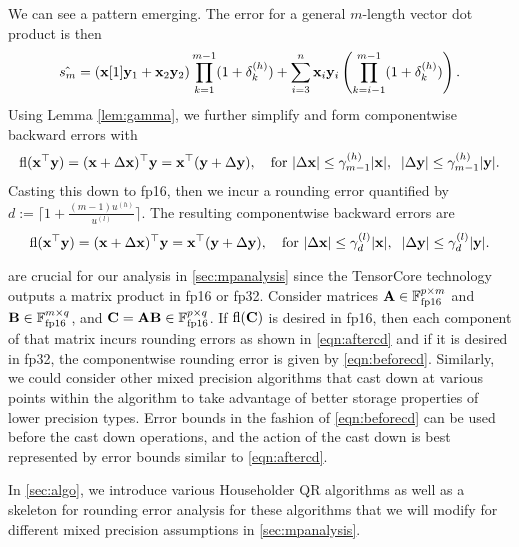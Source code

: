 We can see a pattern emerging. 
The error for a general $m$-length vector dot product is then
\begin{equation}
\label{eqn:dperr_2}
\hat{s_m} = (\bb{x}[1]\bb{y}_1+\bb{x}_2\bb{y}_2)\prod_{k=1}^{m-1}(1+\dd_{k}^{(h)}) + \sum_{i=3}^n \bb{x}_i\bb{y}_i\left(\prod_{k=i-1}^{m-1}(1+\dd_{k}^{(h)})\right).
\end{equation}
Using Lemma \ref{lem:gamma}, we further simplify and form componentwise backward errors with
\begin{equation}
\fl(\bb{x}^{\top}\bb{y}) =(\bb{x}+\Delta\bb{x})^{\top}\bb{y} = \bb{x}^{\top}(\bb{y}+\Delta\bb{y}),\quad\text{for }|\Delta \bb{x}| \leq \gamma^{(h)}_{m-1}|\bb{x}|,\;\; |\Delta \bb{y}|  \leq \gamma_{m-1}^{(h)}|\bb{y}|. \label{eqn:beforecd}
\end{equation}
Casting this down to fp16, then we incur a rounding error quantified by $d:=\lceil1+\frac{(m-1)u^{(h)}}{u^{(l)}}\rceil$. 
The resulting componentwise backward errors are
\begin{equation}
\fl(\bb{x}^{\top}\bb{y}) = (\bb{x}+\Delta\bb{x})^{\top}\bb{y} = \bb{x}^{\top}(\bb{y}+\Delta\bb{y}),\quad\text{for }|\Delta \bb{x}| \leq \gamma^{(l)}_{d}|\bb{x}|,\;\; |\Delta \bb{y}|  \leq \gamma_{d}^{(l)}|\bb{y}|. \label{eqn:aftercd}
\end{equation}

 are crucial for our analysis in \cref{sec:mpanalysis} since the TensorCore technology outputs a matrix product in fp16 or fp32. 
Consider matrices $\mathbf{A}\in\mathbb{F}_{\text{fp16}}^{p\times m}$ and $\mathbf{B}\in\mathbb{F}_{\text{fp16}}^{m\times q}$, and $\mathbf{C}=\mathbf{A}\mathbf{B}\in\mathbb{F}_{\text{fp16}}^{p\times q}$.
If $\mathrm{fl}(\mathbf{C})$ is desired in fp16, then each component of that matrix incurs rounding errors as shown in \cref{eqn:aftercd} and if it is desired in fp32, the componentwise rounding error is given by \cref{eqn:beforecd}.
Similarly, we could consider other mixed precision algorithms that cast down at various points within the algorithm to take advantage of better storage properties of lower precision types. 
Error bounds in the fashion of \cref{eqn:beforecd} can be used before the cast down operations, and the action of the cast down is best represented by error bounds similar to \cref{eqn:aftercd}.\par

In \cref{sec:algo}, we introduce various Householder QR algorithms as well as a skeleton for rounding error analysis for these algorithms that we will modify for different mixed precision assumptions in \cref{sec:mpanalysis}.